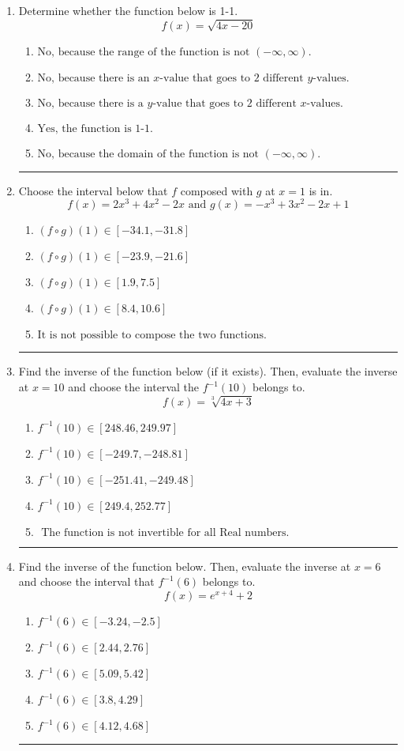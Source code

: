 \documentclass[14pt]{extbook}
\newcommand{\litem}[1]{\item#1\hspace*{-1cm}\rule{\textwidth}{0.4pt}}
\begin{document}
\begin{enumerate}
{\begin{enumerate}[label=\Alph*.]
\end{enumerate} }
\litem{
Determine whether the function below is 1-1.\[ f(x) = \sqrt{4 x - 20} \]\begin{enumerate}[label=\Alph*.]
\item \( \text{No, because the range of the function is not $(-\infty, \infty)$.} \)
\item \( \text{No, because there is an $x$-value that goes to 2 different $y$-values.} \)
\item \( \text{No, because there is a $y$-value that goes to 2 different $x$-values.} \)
\item \( \text{Yes, the function is 1-1.} \)
\item \( \text{No, because the domain of the function is not $(-\infty, \infty)$.} \)

\end{enumerate} }
\litem{
Choose the interval below that $f$ composed with $g$ at $x=1$ is in.\[ f(x) = 2x^{3} +4 x^{2} -2 x \text{ and } g(x) = -x^{3} +3 x^{2} -2 x + 1 \]\begin{enumerate}[label=\Alph*.]
\item \( (f \circ g)(1) \in [-34.1, -31.8] \)
\item \( (f \circ g)(1) \in [-23.9, -21.6] \)
\item \( (f \circ g)(1) \in [1.9, 7.5] \)
\item \( (f \circ g)(1) \in [8.4, 10.6] \)
\item \( \text{It is not possible to compose the two functions.} \)

\end{enumerate} }
\litem{
Find the inverse of the function below (if it exists). Then, evaluate the inverse at $x = 10$ and choose the interval the $f^{-1}(10)$ belongs to.\[ f(x) = \sqrt[3]{4 x + 3} \]\begin{enumerate}[label=\Alph*.]
\item \( f^{-1}(10) \in [248.46, 249.97] \)
\item \( f^{-1}(10) \in [-249.7, -248.81] \)
\item \( f^{-1}(10) \in [-251.41, -249.48] \)
\item \( f^{-1}(10) \in [249.4, 252.77] \)
\item \( \text{ The function is not invertible for all Real numbers. } \)

\end{enumerate} }
\litem{
Find the inverse of the function below. Then, evaluate the inverse at $x = 6$ and choose the interval that $f^{-1}(6)$ belongs to.\[ f(x) = e^{x+4}+2 \]\begin{enumerate}[label=\Alph*.]
\item \( f^{-1}(6) \in [-3.24, -2.5] \)
\item \( f^{-1}(6) \in [2.44, 2.76] \)
\item \( f^{-1}(6) \in [5.09, 5.42] \)
\item \( f^{-1}(6) \in [3.8, 4.29] \)
\item \( f^{-1}(6) \in [4.12, 4.68] \)


\end{enumerate}}
\end{enumerate}
\end{document}
